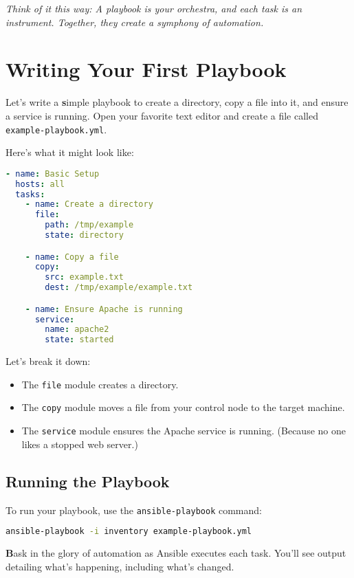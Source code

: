 \textit{Think of it this way: A playbook is your orchestra, and each task is an instrument. Together, they create a symphony of automation.}

\section{Writing Your First Playbook}

Let's write a \textbf{s}imple playbook to create a directory, copy a file into it, and ensure a service is running. Open your favorite text editor and create a file called \texttt{example-playbook.yml}.

Here's what it might look like:
\begin{lstlisting}[language=yaml, caption=Your First Playbook]
- name: Basic Setup
  hosts: all
  tasks:
    - name: Create a directory
      file:
        path: /tmp/example
        state: directory

    - name: Copy a file
      copy:
        src: example.txt
        dest: /tmp/example/example.txt

    - name: Ensure Apache is running
      service:
        name: apache2
        state: started
\end{lstlisting}

Let's break it down:
\begin{itemize}
    \item The \texttt{file} module creates a directory.
    \item The \texttt{copy} module moves a file from your control node to the target machine.
    \item The \texttt{service} module ensures the Apache service is running. (Because no one likes a stopped web server.)
\end{itemize}

\subsection{Running the Playbook}

To run your playbook, use the \texttt{ansible-playbook} command:
\begin{lstlisting}[language=bash, caption=Running Your Playbook]
ansible-playbook -i inventory example-playbook.yml
\end{lstlisting}

\textbf{B}ask in the glory of automation as Ansible executes each task. You'll see output detailing what's happening, including what's changed.

